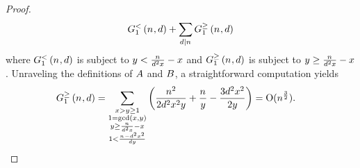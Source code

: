 \begin{proof}
\[{        \BulkQuantityOf{\Size,\TheDivisor}
      }
      +
      \Sum[\TheDivisor\divides\Size]{
        \SmallQuantityOf{\Size,\TheDivisor}
      }
    \]
   where $ \BulkQuantityOf{\Size,\TheDivisor}
$ is subject to $y < \frac{n_{}}{d^2x} - x$ and  $\SmallQuantityOf{\Size,\TheDivisor}$ is subject to $ y \geq \frac{n_{}}{d^2x} - x$.  
    Unraveling the definitions of $A$ and $B$,
    a straightforward computation yields
    \begin{align*}
      \SmallQuantityOf{\Size,\TheDivisor}
      & =
      \Sum[\substack{
      \LeftA>\RightA\geq 1 \\
      1 = \gcdOf{\LeftA,\RightA} \\
      \RightA \geq \frac{\Size}{\TheDivisor^2\LeftA} - \LeftA \\
      1 < \frac{\Size-\TheDivisor^2\LeftA^2}{\TheDivisor\RightA}
      }]{
      \Parens{
      \frac{\Size^2}{2\TheDivisor^2\LeftA^2\RightA}
      +
      \frac{\Size}{\RightA}
      -
      \frac{3\TheDivisor^2\LeftA^2}{2\RightA}
      }} =  \BigO{\Size^{\frac32}}. 
    \end{align*}


\end{proof}
